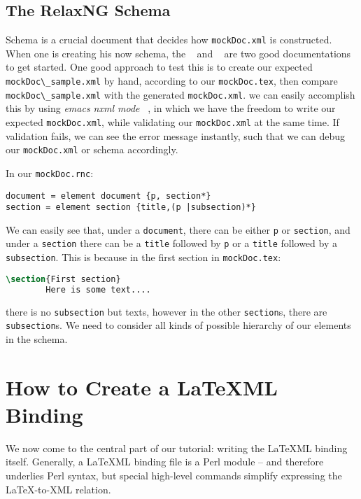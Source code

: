 \documentclass[a4paper]{article}
\def\latexml{{\LaTeX}ML\xspace}
\begin{document}
\subsection{The RelaxNG Schema}\label{sec:rnc}
Schema is a crucial document that decides how \lstinline|mockDoc.xml| is constructed. When
one is creating his now schema, the ~\cite{RelaxNG:tutorial} and ~\cite{XML:tutorial} are two
good documentations to get started. One good approach to test this is to create our
expected \lstinline|mockDoc\_sample.xml| by hand, according to our
\lstinline|mockDoc.tex|, then compare \lstinline|mockDoc\_sample.xml| with the generated
\lstinline|mockDoc.xml|. we can easily accomplish this by using \textit{emacs nxml
  mode} ~\cite{Emacs:nxml}, in which we have the freedom to write
our expected \lstinline|mockDoc.xml|, while validating our \lstinline|mockDoc.xml| at
the same time. If validation fails, we can see the error message instantly, such that we
can debug our \lstinline|mockDoc.xml| or schema accordingly.

In our \lstinline|mockDoc.rnc|:
\begin{lstlisting}
document = element document {p, section*}
section = element section {title,(p |subsection)*}
\end{lstlisting}
We can easily see that, under a \lstinline|document|, there can be either \lstinline|p| or \lstinline|section|, and under a \lstinline|section| there can be a \lstinline|title| followed by \lstinline|p| or a \lstinline|title| followed by a \lstinline|subsection|. This is because in the first section in \lstinline|mockDoc.tex|:
\begin{lstlisting}[language=TeX]
\section{First section}
		Here is some text....
\end{lstlisting}
there is no \lstinline|subsection| but texts, however in the other \lstinline|section|s, there are \lstinline|subsection|s. We need to consider all kinds of possible hierarchy of our elements in the schema.



\section{How to Create a \latexml Binding}\label{sec:bind}
We now come to the central part of our tutorial: writing the \latexml binding
itself. Generally, a \latexml binding file is a Perl module -- and therefore underlies
Perl syntax, but special high-level commands simplify expressing the {\LaTeX}-to-XML
relation.
\end{document}

